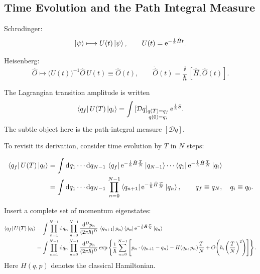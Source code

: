 \subsection{Time Evolution and the Path Integral Measure}

Schrodinger:
\[
  \ket{\psi}\longmapsto U(t)\ket{\psi},
  \qquad
  U(t)=\mathrm{e}^{-\frac{\mathrm{i}}{\hbar}\hat Ht}.
\]

Heisenberg:
\[
  \hat O\longmapsto \bigl(U(t)\bigr)^{-1}\hat O\,U(t)
  \equiv
  \hat O(t),
  \qquad
  \dot{\hat O}(t)=\frac{\ii}{\hbar}\,[\hat H,\hat O(t)].
\]

The Lagrangian transition amplitude is written
\[
  \bra{q_f}U(T)\ket{q_i}
  =
  \int
  \left[\mathcal D q\right]_{\substack{q(T)=q_f\\ q(0)=q_i}}
  \mathrm{e}^{\frac{\mathrm{i}}{\hbar}S}.
\]
The subtle object here is the path-integral measure $[\mathcal Dq]$.

To revisit its derivation, consider time evolution by $T$ in $N$ steps:
\begin{center}
\end{center}

\[
\begin{aligned}
  \bra{q_f}U(T)\ket{q_i}
  &=
  \int \mathrm{d} q_1\cdots \mathrm{d} q_{N-1}\,
  \bra{q_f}\mathrm{e}^{-\frac{\mathrm{i}}{\hbar}\hat H\frac{T}{N}}\ket{q_{N-1}}
  \cdots
  \bra{q_1}\mathrm{e}^{-\frac{\mathrm{i}}{\hbar}\hat H\frac{T}{N}}\ket{q_i}
  \\
  &=
  \int \mathrm{d} q_1\cdots \mathrm{d} q_{N-1}\,
  \prod_{n=0}^{N-1}
  \bra{q_{n+1}}\mathrm{e}^{-\frac{\mathrm{i}}{\hbar}\hat H\frac{T}{N}}\ket{q_n},
  \qquad
  q_f\equiv q_N,\quad q_i\equiv q_0.
\end{aligned}
\]

Insert a complete set of momentum eigenstates:
\[
\begin{aligned}
  \bra{q_f}U(T)\ket{q_i}
  &=
  \int
  \prod_{n=1}^{N-1}\mathrm{d} q_n
  \prod_{n=0}^{N-1}\frac{\mathrm{d}^D p_n}{(2\pi\hbar)^D}\,
  \bra{q_{n+1}}p_n\rangle
  \bra{p_n}\mathrm{e}^{-\frac{\mathrm{i}}{\hbar}\hat H\frac{T}{N}}\ket{q_n}
  \\
  &=
  \int
  \prod_{n=1}^{N-1}\mathrm{d} q_n
  \prod_{n=0}^{N-1}\frac{\mathrm{d}^D p_n}{(2\pi\hbar)^D}
  \exp\left\{
    \frac{\mathrm{i}}{\hbar}
    \sum_{n=0}^{N-1}
    \left[
      p_n\cdot(q_{n+1}-q_n)
      -H(q_n,p_n)\frac{T}{N}
      +O\!\left(\hbar,\left(\frac{T}{N}\right)^2\right)
    \right]
  \right\}.
\end{aligned}
\]
Here $H(q,p)$ denotes the classical Hamiltonian.

